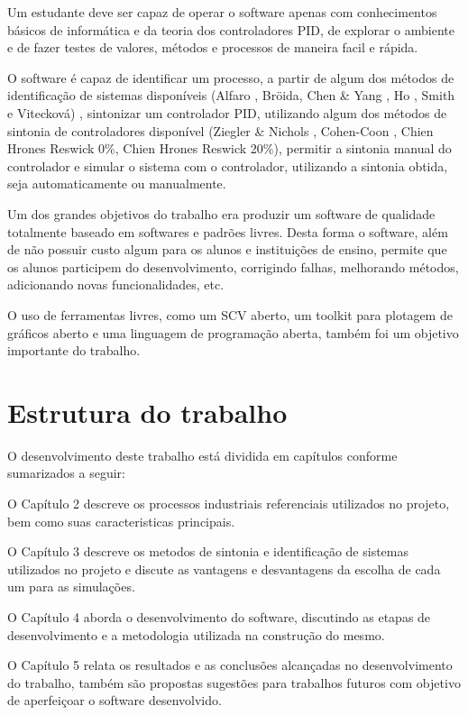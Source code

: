    Um estudante deve ser capaz de operar o software apenas com conhecimentos
    básicos de informática e da teoria dos controladores \acs{PID}, de explorar o
    ambiente e de fazer testes de valores, métodos e processos de maneira facil e
    rápida.
    
    O software é capaz de identificar um processo, a partir de algum dos
    métodos de identificação de sistemas disponíveis (Alfaro \cite{Alfaro2}, Bröida,
    Chen \& Yang \cite{ChenYang}, Ho \cite{Ho}, Smith \cite{Smith} e Vitecková)
    \cite{Viteckova}, sintonizar um controlador \acs{PID},
    utilizando algum dos métodos de sintonia de controladores disponível (Ziegler
    \& Nichols \cite{ZieglerNicholsAsme}, Cohen-Coon \cite{CohenCoon},
    Chien Hrones Reswick 0\%, Chien Hrones Reswick 20\%),
    permitir a sintonia manual do controlador e simular o sistema com o controlador,
    utilizando a sintonia obtida, seja automaticamente ou manualmente.
    
    Um dos grandes objetivos do trabalho era produzir um software de qualidade 
    totalmente baseado em softwares e padrões livres. Desta forma o software,
    além de não possuir custo algum para os alunos e instituições de ensino, permite
    que os alunos participem do desenvolvimento, corrigindo falhas, melhorando
    métodos, adicionando novas funcionalidades, etc.
    
    O uso de ferramentas livres, como um \ac{SCV} aberto, um toolkit para plotagem
    de gráficos aberto e uma linguagem de programação aberta, também foi um objetivo
    importante do trabalho.

\section{Estrutura do trabalho}

    O desenvolvimento deste trabalho está dividida em capítulos conforme sumarizados
    a seguir:

    O Capítulo 2 descreve os processos industriais referenciais utilizados no projeto,
    bem como suas caracteristicas principais.
    
    O Capítulo 3 descreve os metodos de sintonia e identificação de sistemas utilizados
    no projeto e discute as vantagens e desvantagens da escolha de cada um para as
    simulações.
    
    O Capítulo 4 aborda o desenvolvimento do software, discutindo as etapas de
    desenvolvimento e a metodologia utilizada na construção do mesmo.
    
    O Capítulo 5 relata os resultados e as conclusões alcançadas no desenvolvimento do
    trabalho, também são propostas sugestões para trabalhos futuros com objetivo de
    aperfeiçoar o software desenvolvido.
